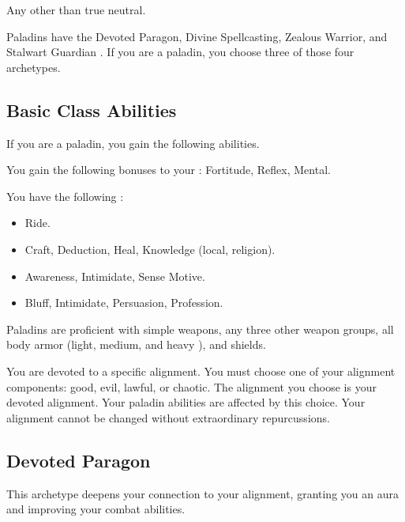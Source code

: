      Any other than true neutral.

     Paladins have the Devoted Paragon, Divine Spellcasting, Zealous Warrior, and Stalwart Guardian .
    If you are a paladin, you choose three of those four archetypes.

    \subsection{Basic Class Abilities}
        If you are a paladin, you gain the following abilities.

        You gain the following bonuses to your :  Fortitude,  Reflex,  Mental.

        You have the following :
        \begin{itemize}
            \item {} Ride.
            \item {} Craft, Deduction, Heal, Knowledge (local, religion).
            \item {} Awareness, Intimidate, Sense Motive.
            \item {} Bluff, Intimidate, Persuasion, Profession.
        \end{itemize}

        Paladins are proficient with simple weapons, any three other weapon groups, all body armor (light, medium, and heavy ), and shields.

        You are devoted to a specific alignment.
        You must choose one of your alignment components: good, evil, lawful, or chaotic.
        The alignment you choose is your devoted alignment.
        Your paladin abilities are affected by this choice.
        Your alignment cannot be changed without extraordinary repurcussions.

    \subsection{Devoted Paragon}
        This archetype deepens your connection to your alignment, granting you an aura and improving your combat abilities.

